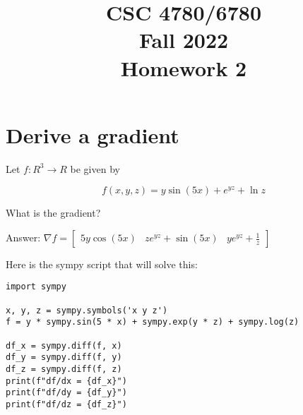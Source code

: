 \documentclass[11pt,english]{article}
\begin{document}
\title{CSC 4780/6780 \\
Fall 2022\\ Homework 2}
\maketitle


\section{Derive a gradient}

Let $f: R^3 \rightarrow R$ be given by

$$f(x, y,z) = y\sin(5x) + e^{yz} + \ln{z}$$

What is the gradient?

Answer: $\nabla f =\begin{bmatrix}  5 y \cos(5x) & z e^{yz} +\sin(5x) &  y e^{yz} + \frac{1}{z} \end{bmatrix}$

Here is the sympy script that will solve this:
\begin{verbatim}
import sympy

x, y, z = sympy.symbols('x y z')
f = y * sympy.sin(5 * x) + sympy.exp(y * z) + sympy.log(z)

df_x = sympy.diff(f, x)
df_y = sympy.diff(f, y)
df_z = sympy.diff(f, z)
print(f"df/dx = {df_x}")
print(f"df/dy = {df_y}")
print(f"df/dz = {df_z}")
\end{verbatim}
\end{document}
